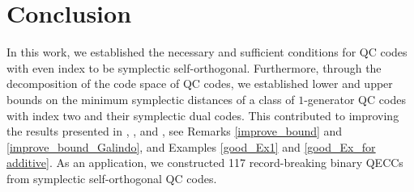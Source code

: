 \documentclass[journal]{IEEEtran}
\begin{document}
\section{Conclusion}\label{sec5}

In this work, we established the necessary and sufficient conditions for QC codes with even 
index to be symplectic self-orthogonal. 
Furthermore, through the decomposition of the code space of QC codes, we established lower and upper bounds on the minimum symplectic distances of a class of $1$-generator QC codes with index two and their symplectic dual codes. 
This contributed to improving the results presented in \cite{galindo2018quasi}, \cite{dastbasteh2023polynomial}, and \cite{GuanAdditive2023}, see Remarks \ref{improve_bound} and \ref{improve_bound_Galindo}, and Examples \ref{good_Ex1} and \ref{good_Ex_for additive}.
As an application, we constructed 117 record-breaking binary QECCs from symplectic self-orthogonal QC codes.


\end{document}
